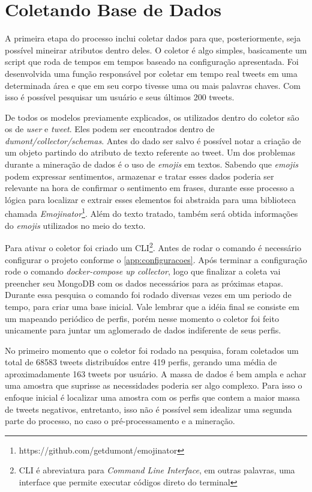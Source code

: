 \section{Coletando Base de Dados}
A primeira etapa do processo inclui coletar dados para que, posteriormente, seja possível mineirar atributos dentro deles. O coletor é algo simples, basicamente um script que roda de tempos em tempos baseado na configuração apresentada. Foi desenvolvida uma função responsável por coletar em tempo real tweets em uma determinada área e que em seu corpo tivesse uma ou mais palavras chaves. Com isso é possível pesquisar um usuário e seus últimos 200 tweets.

De todos os modelos previamente explicados, os utilizados dentro do coletor são os de \textit{user} e \textit{tweet}. Eles podem ser encontrados dentro de \textit{dumont/collector/schemas}. Antes do dado ser salvo é possível notar a criação de um objeto partindo do atributo de texto referente ao tweet. Um dos problemas durante a mineração de dados é o uso de \textit{emojis} em textos. Sabendo que \textit{emojis} podem expressar sentimentos, armazenar e tratar esses dados poderia ser relevante na hora de confirmar o sentimento em frases, durante esse processo a lógica para localizar e extrair esses elementos foi abstraida para uma biblioteca chamada \textit{Emojinator}\footnote{https://github.com/getdumont/emojinator}. Além do texto tratado, também será obtida informações do \textit{emojis} utilizados no meio do texto.

Para ativar o coletor foi criado um CLI\footnote{CLI é abreviatura para \textit{Command Line Interface}, em outras palavras, uma interface que permite executar códigos direto do terminal}. Antes de rodar o comando é necessário configurar o projeto conforme o \autoref{app:configuracoes}. Após terminar a configuração rode o comando \textit{docker-compose up collector}, logo que finalizar a coleta vai preencher seu MongoDB com os dados necessários para as próximas etapas. Durante essa pesquisa o comando foi rodado diversas vezes em um periodo de tempo, para criar uma base inicial. Vale lembrar que a idéia final se consiste em um mapeando periódico de perfis, porém nesse momento o coletor foi feito unicamente para juntar um aglomerado de dados indiferente de seus perfis.

No primeiro momento que o coletor foi rodado na pesquisa, foram coletados um total de 68583 tweets distribuídos entre 419 perfis, gerando uma média de aproximadamente 163 tweets por usuário. A massa de dados é bem ampla e achar uma amostra que suprisse as necessidades poderia ser algo complexo. Para isso o enfoque inicial é localizar uma amostra com os perfis que contem a maior massa de tweets negativos, entretanto, isso não é possível sem idealizar uma segunda parte do processo, no caso o pré-processamento e a mineração.
